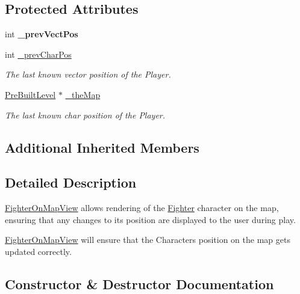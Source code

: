 \subsection*{Protected Attributes}
\begin{DoxyCompactItemize}
\item 
\hypertarget{class_fighter_on_map_view_a1fe8d0d16f040441e11da3f4586a709a}{}\label{class_fighter_on_map_view_a1fe8d0d16f040441e11da3f4586a709a} 
int {\bfseries \+\_\+prev\+Vect\+Pos}
\item 
\hypertarget{class_fighter_on_map_view_a61bbad37f81bdab3127ce13481777a69}{}\label{class_fighter_on_map_view_a61bbad37f81bdab3127ce13481777a69} 
int \hyperlink{class_fighter_on_map_view_a61bbad37f81bdab3127ce13481777a69}{\+\_\+prev\+Char\+Pos}
\begin{DoxyCompactList}\small\item\em The last known vector position of the Player. \end{DoxyCompactList}\item 
\hypertarget{class_fighter_on_map_view_a3b8e0bae2204cd40dac9402d54611d66}{}\label{class_fighter_on_map_view_a3b8e0bae2204cd40dac9402d54611d66} 
\hyperlink{class_pre_built_level}{Pre\+Built\+Level} $\ast$ \hyperlink{class_fighter_on_map_view_a3b8e0bae2204cd40dac9402d54611d66}{\+\_\+the\+Map}
\begin{DoxyCompactList}\small\item\em The last known char position of the Player. \end{DoxyCompactList}\end{DoxyCompactItemize}
\subsection*{Additional Inherited Members}


\subsection{Detailed Description}
\hyperlink{class_fighter_on_map_view}{Fighter\+On\+Map\+View} allows rendering of the \hyperlink{class_fighter}{Fighter} character on the map, ensuring that any changes to its position are displayed to the user during play. 

\hyperlink{class_fighter_on_map_view}{Fighter\+On\+Map\+View} will ensure that the Character\textquotesingle{}s position on the map gets updated correctly. 

\subsection{Constructor \& Destructor Documentation}
\hypertarget{class_fighter_on_map_view_a825620eacc7214901bd8d5b640fbb1c2}{}\label{class_fighter_on_map_view_a825620eacc7214901bd8d5b640fbb1c2} 
